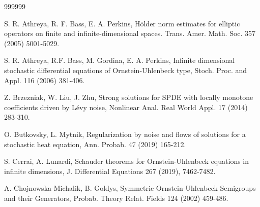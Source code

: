 \documentclass[preprint]{imsart}
\begin{document}
 
   
 
\begin{thebibliography}  {999999}                                                                                           %
{\small 
{}
 S. R. Athreya, R. F. Bass, E. A. Perkins, H\"older norm estimates for elliptic operators on finite and infinite-dimensional spaces. Trans. Amer. Math. Soc. 357 (2005)  5001-5029.





  S. R. Athreya, R.F. Bass, M. Gordina, E. A. Perkins, 
Infinite dimensional stochastic differential equations of Ornstein-Uhlenbeck type, Stoch. Proc. and Appl. 116 (2006) 381-406.  
 
 
  {  Z. Brzezniak, W. Liu, J. Zhu,  Strong solutions for SPDE with locally monotone coefficients driven by L\'evy noise,   
 Nonlinear Anal. Real World Appl. 17 (2014) 283-310.}


 O.  Butkovsky, L. Mytnik,  Regularization by noise and flows of solutions for a stochastic heat equation, Ann. Probab. 47 (2019)  165-212.   
 


 S. Cerrai, A. Lunardi, Schauder theorems for Ornstein-Uhlenbeck equations in infinite dimensions, 
 J. Differential Equations 267 (2019),  7462-7482.  
 
 


A. Chojnowska-Michalik, B. Goldys,  Symmetric Ornstein-Uhlenbeck
Semigroups and their Generators, {Probab. Theory Relat.
Fields} 124 (2002) 459-486.

 
}
\end{thebibliography}
\end{document}
